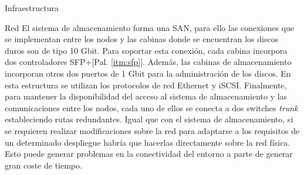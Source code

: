 \begin{section}{Infraestructura}
\begin{subsection}{Red}
    El sistema de almacenamiento forma una SAN, para ello las conexiones que se implementan entre los nodos y las cabinas donde se encuentran los discos duros son de tipo 10 Gbit. Para soportar esta conexión, cada cabina incorpora dos controladores SFP+[Pal. \ref{itm:sfp}]. Además, las cabinas de almacenamiento incorporan otros dos puertos de 1 Gbit para la administración de los discos. En esta estructura se utilizan los protocolos de red Ethernet y iSCSI. Finalmente, para mantener la disponibilidad del acceso al sistema de almacenamiento y las comunicaciones entre los nodos, cada uno de ellos se conecta a dos switches \textit{trunk} estableciendo rutas redundantes.
    Igual que con el sistema de almacenamiento, si se requieren realizar modificaciones sobre la red para adaptarse a los requisitos de un determinado despliegue habría que hacerlas directamente sobre la red física. Esto puede generar problemas en la conectividad del entorno a parte de generar gran coste de tiempo.
\end{subsection}


\end{section}

